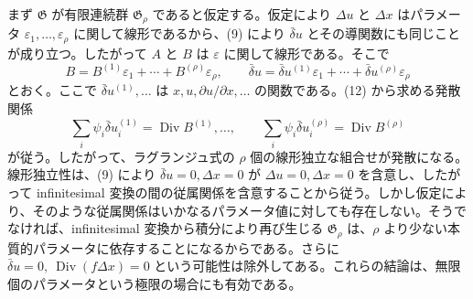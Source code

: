 \documentclass[11pt]{article}
\newcommand{\D}{\Delta}
\newcommand{\eps}{\varepsilon}
\providecommand{\Div}{\operatorname{Div}}
\providecommand{\G}{\mathfrak G}
\providecommand{\bd}{\bar{\delta}}
\providecommand{\p}{\partial}
\begin{document}
まず \(\G\) が有限連続群 \(\G_\rho\) であると仮定する。仮定により \(\D u\) と \(\D x\) はパラメータ \(\eps_1,\ldots,\eps_\rho\) に関して線形であるから、(9) により \(\bd u\) とその導関数にも同じことが成り立つ。したがって \(A\) と \(B\) は \(\eps\) に関して線形である。そこで
\[
B=B^{(1)}\eps_1+\cdots+B^{(\rho)}\eps_\rho,\qquad
\bd u=\bd u^{(1)}\eps_1+\cdots+\bd u^{(\rho)}\eps_\rho
\]
とおく。ここで \(\bd u^{(1)},\ldots\) は \(x,u,\p u/\p x,\ldots\) の関数である。(12) から求める発散関係
\begin{equation}
\sum_i\psi_i\bd u_i^{(1)}=\Div B^{(1)},\ldots,\qquad
\sum_i\psi_i\bd u_i^{(\rho)}=\Div B^{(\rho)}
\tag{13}
\end{equation}
が従う。したがって、ラグランジュ式の \(\rho\) 個の線形独立な組合せが発散になる。線形独立性は、(9) により \(\bd u=0,\D x=0\) が \(\D u=0,\D x=0\) を含意し、したがって infinitesimal 変換の間の従属関係を含意することから従う。しかし仮定により、そのような従属関係はいかなるパラメータ値に対しても存在しない。そうでなければ、infinitesimal 変換から積分により再び生じる \(\G_\rho\) は、\(\rho\) より少ない本質的パラメータに依存することになるからである。さらに \(\bd u=0,\ \Div(f\D x)=0\) という可能性は除外してある。これらの結論は、無限個のパラメータという極限の場合にも有効である。
\end{document}
